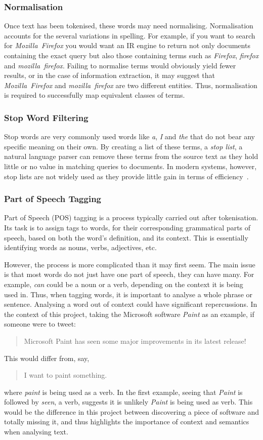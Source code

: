 \subsubsection{Normalisation}
Once text has been tokenised, these words may need normalising. Normalisation accounts for the several variations in spelling. For example, if you want to search for \emph{Mozilla~Firefox} you would want an IR engine to return not only documents containing the exact query but also those containing terms such as \emph{Firefox}, \emph{firefox} and \emph{mozilla~firefox}. Failing to normalise terms would obviously yield fewer results, or in the case of information extraction, it may suggest that \emph{Mozilla~Firefox} and \emph{mozilla~firefox} are two different entities. Thus, normalisation is required to successfully map equivalent classes of terms.

\subsubsection{Stop Word Filtering}
Stop words are very commonly used words like \emph{a}, \emph{I} and \emph{the} that do not bear any specific meaning on their own. By creating a list of these terms, a \emph{stop list}, a natural language parser can remove these terms from the source text as they hold little or no value in matching queries to documents. In modern systems, however, stop lists are not widely used as they provide little gain in terms of efficiency~\cite{manning2008}.

\subsubsection{Part of Speech Tagging}
Part of Speech (POS) tagging is a process typically carried out after tokenisation. Its task is to assign tags to words, for their corresponding grammatical parts of speech, based on both the word's definition, and its context. This is essentially identifying words as nouns, verbs, adjectives, etc.

However, the process is more complicated than it may first seem. The main issue is that most words do not just have one part of speech, they can have many. For example, \emph{can} could be a noun or a verb, depending on the context it is being used in. Thus, when tagging words, it is important to analyse a whole phrase or sentence. Analysing a word out of context could have significant repercussions. In the context of this project, taking the Microsoft software \emph{Paint} as an example, if someone were to tweet:
\begin{quote}
Microsoft Paint has seen some major improvements in its latest release!
\end{quote}
This would differ from, say,
\begin{quote}
I want to paint something.
\end{quote}
where \emph{paint} is being used as a verb. In the first example, seeing that \emph{Paint} is followed by \emph{seen}, a verb, suggests it is unlikely \emph{Paint} is being used as verb.  This would be the difference in this project between discovering a piece of software and totally missing it, and thus highlights the importance of context and semantics when analysing text.

